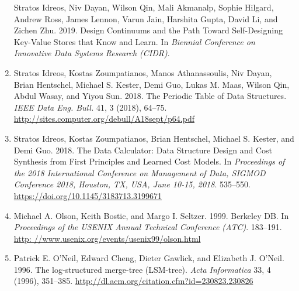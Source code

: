 \documentclass[a4paper,12pt,notitlepage,twoside,openright]{article}
\begin{document}
\begin{enumerate}
  Stratos Idreos, Niv Dayan, Wilson Qin, Mali Akmanalp, Sophie Hilgard,
  Andrew Ross, James Lennon, Varun Jain, Harshita Gupta, David Li, and
  Zichen Zhu. 2019.
  Design Continuums and the Path Toward Self-Designing Key-Value Stores
  that Know and Learn. In \emph{Biennial Conference on Innovative Data Systems
Research (CIDR)}.
\item
  Stratos Idreos, Kostas Zoumpatianos, Manos Athanassoulis, Niv Dayan,
  Brian
  Hentschel, Michael S. Kester, Demi Guo, Lukas M. Maas, Wilson Qin, Abdul
  Wasay, and Yiyou Sun. 2018. The Periodic Table of Data Structures.
  \emph{IEEE Data Eng. Bull.} 41, 3 (2018), 64--75.
  \url{http://sites.computer.org/debull/A18sept/p64.pdf}
\item
  Stratos Idreos, Kostas Zoumpatianos, Brian Hentschel, Michael S.
  Kester, and Demi Guo. 2018. The Data Calculator: Data Structure Design
  and Cost Synthesis from First Principles and Learned Cost Models. In
  \emph{Proceedings of the 2018 International Conference on Management
  of Data, SIGMOD Conference 2018, Houston, TX, USA, June 10-15, 2018}.
  535--550. \url{https://doi.org/10.1145/3183713.3199671}
\item
  Michael A. Olson, Keith Bostic, and Margo I. Seltzer. 1999. Berkeley
  DB. In \emph{Proceedings of the USENIX Annual Technical Conference
  (ATC)}. 183--191.
  \href{http://www.usenix.org/events/usenix99/olson.html}{http:
  //www.usenix.org/events/usenix99/olson.html}
\item
  Patrick E. O'Neil, Edward Cheng, Dieter Gawlick, and Elizabeth
  J. O'Neil. 1996. The log-structured merge-tree (LSM-tree). \emph{Acta
  Informatica} 33, 4 (1996), 351--385.
  \url{http://dl.acm.org/citation.cfm?id=230823.230826}
\end{enumerate}
\end{document}
